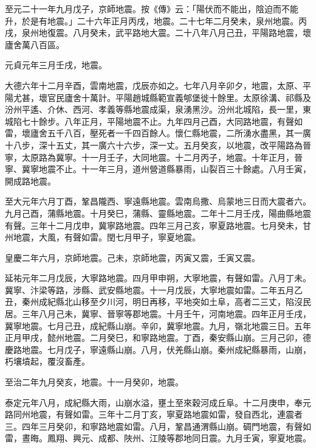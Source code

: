 \begin{pinyinscope}
 至元二十一年九月戊子，京師地震。按《傳》云：「陽伏而不能出，陰迫而不能升，於是有地震。」二十六年正月丙戌，地震。二十七年二月癸未，泉州地震。丙戌，泉州地復震。八月癸未，武平路地大震。二十八年八月己丑，平陽路地震，壞廬舍萬八百區。



 元貞元年三月壬戌，地震。



 大德六年十二月辛酉，雲南地震，戊辰亦如之。七年八月辛卯夕，地震，太原、平陽尤甚，壞官民廬舍十萬計。平陽趙城縣範宣義郇堡徙十餘里。太原徐溝、祁縣及汾州平遙、介休、西河、孝義等縣地震成渠，泉湧黑沙。汾州北城陷，長一里，東城陷七十餘步。八年正月，平陽地震不止。九年四月己酉，大同路地震，有聲如雷，壞廬舍五千八百，壓死者一千四百餘人。懷仁縣地震，二所湧水盡黑，其一廣十八步，深十五丈，其一廣六十六步，深一丈。五月癸亥，以地震，改平陽路為晉寧，太原路為冀寧。十一月壬子，大同地震。十二月丙子，地震。十年正月，晉寧、冀寧地震不止。十一年三月，道州營道縣暴雨，山裂百三十餘處。八月壬寅，開成路地震。



 至大元年六月丁酉，鞏昌隴西、寧遠縣地震。雲南烏撒、烏蒙地三日而大震者六。九月己酉，蒲縣地震。十月癸巳，蒲縣、靈縣地震。二年十二月壬戌，陽曲縣地震有聲。三年十二月戊申，冀寧路地震。四年三月己亥，寧夏路地震。七月癸未，甘州地震，大風，有聲如雷。閏七月甲子，寧夏地震。



 皇慶二年六月，京師地震。己未，京師地震，丙寅又震，壬寅又震。



 延祐元年二月戊辰，大寧路地震。四月甲申朔，大寧地震，有聲如雷。八月丁未。冀寧、汴梁等路，涉縣、武安縣地震。十一月戊辰，大寧地震如雷。二年五月乙丑，秦州成紀縣北山移至夕川河，明日再移，平地突如土阜，高者二三丈，陷沒民居。三年八月己未，冀寧、晉寧等郡地震。十月壬午，河南地震。四年正月壬戌，冀寧地震。七月己丑，成紀縣山崩。辛卯，冀寧地震。九月，嶺北地震三日。五年正月甲戌，懿州地震。二月癸巳，和寧路地震。丁酉，秦安縣山崩。三月己卯，德慶路地震。七月戊子，寧遠縣山崩。八月，伏羌縣山崩。秦州成紀縣暴雨，山崩，朽壤墳起，覆沒畜產。



 至治二年九月癸亥，地震。十一月癸卯，地震。



 泰定元年八月，成紀縣大雨，山崩水溢，壅土至來穀河成丘阜。十二月庚申，奉元路同州地震，有聲如雷。三年十二月丁亥，寧夏路地震如雷，發自西北，連震者三。四年三月癸卯，和寧路地震如雷。八月，鞏昌通渭縣山崩。碉門地震，有聲如雷，晝晦。鳳翔、興元、成都、陜州、江陵等郡地同日震。九月壬寅，寧夏地震。




\end{pinyinscope}
